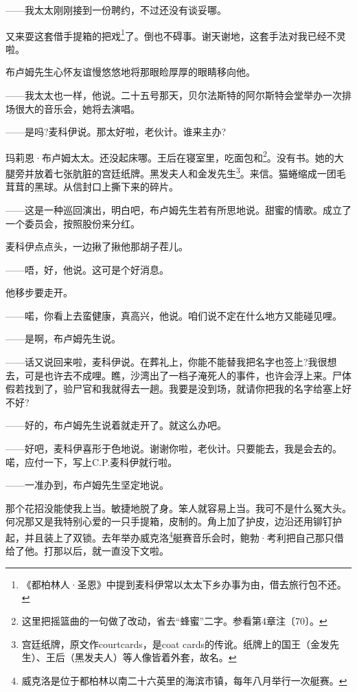 \par ——我太太刚刚接到一份聘约，不过还没有谈妥哪。
\par 又来耍这套借手提箱的把戏\footnote{《都柏林人·圣恩》中提到麦科伊常以太太下乡办事为由，借去旅行包不还。}了。倒也不碍事。谢天谢地，这套手法对我已经不灵啦。
\par 布卢姆先生心怀友谊慢悠悠地将那眼睑厚厚的眼睛移向他。
\par ——我太太也一样，他说。二十五号那天，贝尔法斯特的阿尔斯特会堂举办一次排场很大的音乐会，她将去演唱。
\par ——是吗?麦科伊说。那太好啦，老伙计。谁来主办?
\par 玛莉恩·布卢姆太太。还没起床哪。王后在寝室里，吃面包和\footnote{这里把摇篮曲的一句做了改动，省去“蜂蜜”二字。参看第4章注〔70〕。}。没有书。她的大腿旁并放着七张肮脏的宫廷纸牌。黑发夫人和金发先生\footnote{宫廷纸牌，原文作courtcards，是coat cards的传讹。纸牌上的国王（金发先生）、王后（黑发夫人）等人像皆着外套，故名。}。来信。猫蜷缩成一团毛茸茸的黑球。从信封口上撕下来的碎片。
\par ——这是一种巡回演出，明白吧，布卢姆先生若有所思地说。甜蜜的情歌。成立了一个委员会，按照股份来分红。
\par 麦科伊点点头，一边揪了揪他那胡子茬儿。
\par ——唔，好，他说。这可是个好消息。
\par 他移步要走开。
\par ——喏，你看上去蛮健康，真高兴，他说。咱们说不定在什么地方又能碰见哩。
\par ——是啊，布卢姆先生说。
\par ——话又说回来啦，麦科伊说。在葬礼上，你能不能替我把名字也签上?我很想去，可是也许去不成哩。瞧，沙湾出了一档子淹死人的事件，也许会浮上来。尸体假若找到了，验尸官和我就得去一趟。我要是没到场，就请你把我的名字给塞上好不好?
\par ——好的，布卢姆先生说着就走开了。就这么办吧。
\par ——好吧，麦科伊喜形于色地说。谢谢你啦，老伙计。只要能去，我是会去的。喏，应付一下，写上C.P.麦科伊就行啦。
\par ——一准办到，布卢姆先生坚定地说。
\par 那个花招没能使我上当。敏捷地脱了身。笨人就容易上当。我可不是什么冤大头。何况那又是我特别心爱的一只手提箱，皮制的。角上加了护皮，边沿还用铆钉护起，并且装上了双锁。去年举办威克洛\footnote{威克洛是位于都柏林以南二十六英里的海滨市镇，每年八月举行一次艇赛。}艇赛音乐会时，鲍勃·考利把自己那只借给了他。打那以后，就一直没下文啦。
